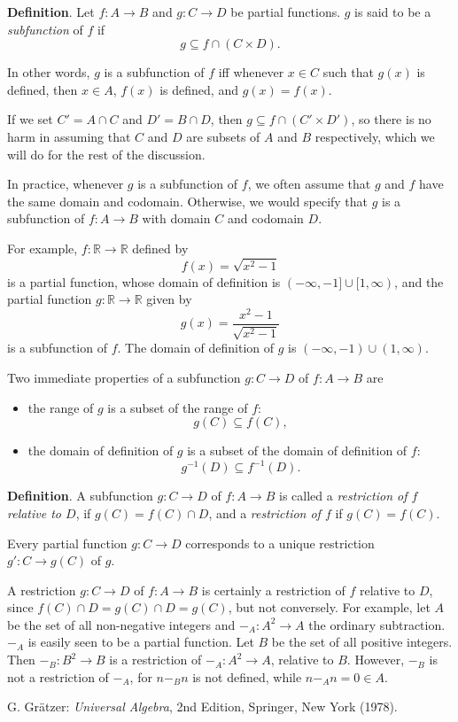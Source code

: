 \documentclass[12pt]{article}
\begin{document}
\textbf{Definition}.  Let $f:A\to B$ and $g:C\to D$ be partial functions.  $g$ is said to be a \emph{subfunction} of $f$ if $$g\subseteq f \cap (C\times D).$$

In other words, $g$ is a subfunction of $f$ iff whenever $x\in C$ such that $g(x)$ is defined, then $x\in A$, $f(x)$ is defined, and $g(x)=f(x)$.

If we set $C'=A\cap C$ and $D'=B\cap D$, then $g\subseteq f\cap (C'\times D')$, so there is no harm in assuming that $C$ and $D$ are subsets of $A$ and $B$ respectively, which we will do for the rest of the discussion.

In practice, whenever $g$ is a subfunction of $f$, we often assume that $g$ and $f$ have the same domain and codomain.  Otherwise, we would specify that $g$ is a subfunction of $f:A\to B$ with domain $C$ and codomain $D$.

For example, $f:\mathbb{R} \to \mathbb{R}$ defined by $$f(x)=\sqrt{x^2-1}$$ is a partial function, whose domain of definition is $(-\infty,-1]\cup [1,\infty)$, and the partial function $g:\mathbb{R} \to \mathbb{R}$ given by 
$$g(x)=\displaystyle{\frac{x^2-1}{\sqrt{x^2-1}}}$$ is a subfunction of $f$.  The domain of definition of $g$ is $(-\infty,-1)\cup (1,\infty)$.

Two immediate properties of a subfunction $g:C\to D$ of $f:A\to B$ are 
\begin{itemize}
\item
the range of $g$ is a subset of the range of $f$: $$g(C)\subseteq f(C),$$
\item
the domain of definition of $g$ is a subset of the domain of definition of $f$: $$g^{-1}(D)\subseteq f^{-1}(D).$$
\end{itemize}

\textbf{Definition}.  A subfunction $g:C\to D$ of $f:A\to B$ is called a \emph{restriction of $f$ relative to $D$}, if $g(C)=f(C)\cap D$, and a \emph{restriction of $f$} if $g(C)=f(C)$.

Every partial function $g:C\to D$ corresponds to a unique restriction $g':C\to g(C)$ of $g$.

A restriction $g:C\to D$ of $f:A\to B$ is certainly a restriction of $f$ relative to $D$, since $f(C)\cap D = g(C)\cap D = g(C)$, but not conversely.  For example, let $A$ be the set of all non-negative integers and $-_A: A^2\to A$ the ordinary subtraction.  $-_A$ is easily seen to be a partial function.  Let $B$ be the set of all positive integers.  Then $-_B:B^2\to B$ is a restriction of $-_A:A^2\to A$, relative to $B$.  However, $-_B$ is not a restriction of $-_A$, for $n -_B n$ is not defined, while $n -_A n = 0\in A$.

\begin{thebibliography}{7}
 G. Gr\"{a}tzer: {\em Universal Algebra}, 2nd Edition, Springer, New York (1978).
\end{thebibliography}
\end{document}
